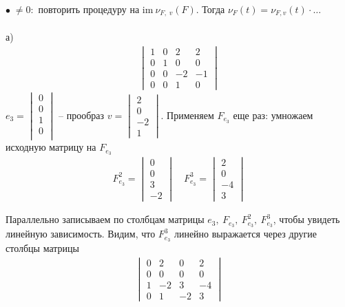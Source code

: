 		$\bullet \; \neq 0:$ повторить процедуру на $\text{im}\ \nu_{F, \; v}(F)$. Тогда $\nu_{F}(t) = \nu_{F, v}(t) \cdot \ldots$\\ 
		\\
		а) 
		\begin{gather*}
			\begin{vmatrix}
				1 & 0 & 2 & 2\\
				0 & 1 & 0 & 0\\
				0 & 0 & -2 & -1\\
				0 & 0 & 1 & 0
			\end{vmatrix}
		\end{gather*}
		$e_{3} = \begin{vmatrix} 0\\ 0\\ 1\\ 0\\ \end{vmatrix}$ -- прообраз $v = \begin{vmatrix} 2\\ 0\\ -2\\ 1 \end{vmatrix}$. Применяем $F_{e_{3}}$ еще раз: умножаем исходную матрицу на $F_{e_{3}}$\\
		\begin{gather*}
			F_{e_{3}}^{2} = 
			\begin{vmatrix}
				0\\ 0\\ 3\\ -2
			\end{vmatrix}\quad 
			F^{3}_{e_{3}} = 
			\begin{vmatrix}
				2\\ 0\\ -4\\ 3
			\end{vmatrix} 
		\end{gather*}
		
		Параллельно записываем по столбцам матрицы $e_{3},\ F_{e_{3}},\ F^{2}_{e_{3}},\ F^{3}_{e_{3}}$, чтобы увидеть линейную зависимость. Видим, что $F^{3}_{e_{3}}$ линейно выражается через другие столбцы матрицы
		\begin{gather*}
			\begin{vmatrix}
				0 & 2 & 0 & 2\\
				0 & 0 & 0 & 0\\
				1 & -2 & 3 & -4\\
				0 & 1 & -2 & 3
			\end{vmatrix}
		\end{gather*}
		
